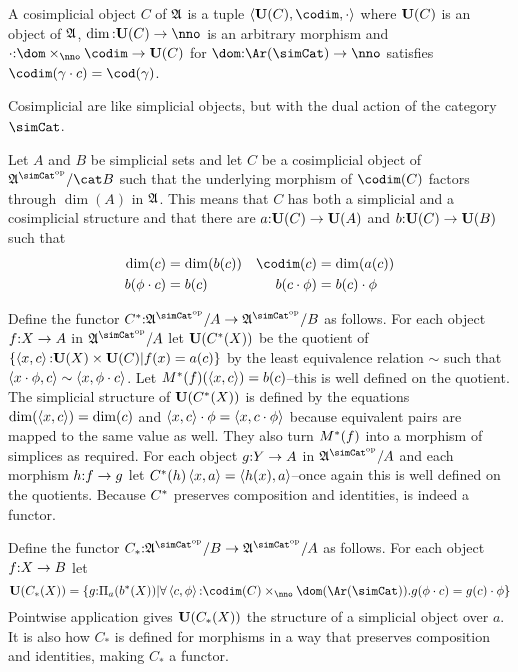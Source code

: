 \documentclass[csh.tex]{subfiles}
\begin{document}
\begin{definition} A cosimplicial object $C$ of $\mathfrak A$ is a tuple $\tuplet{\base(C),\codim,\cdot}$ where $\mathbf{U}(C)$ is an object of $\mathfrak A$, $\dim\of\base(C)\to\nno$ is an arbitrary morphism and $\cdot\of \dom\times_{\nno}\codim \to \base (C)$ for $\dom\of \Ar(\simCat)\to\nno$
 satisfies $\codim(\gamma\cdot c) = \cod(\gamma)$.
\end{definition}

Cosimplicial are like simplicial objects, but with the dual action of the category $\simCat$.

\begin{definition} Let $A$ and $B$ be simplicial sets and let $C$ be a cosimplicial object of $\ambient\s/\cat B$ such that the underlying morphism of $\codim(C)$ factors through $\dim(A)$ in $\mathfrak A$. This means that $C$ has both a simplicial and a cosimplicial structure and that
there are $a\mathord :\mathbf{U}(C)\to\mathbf{U}(A)$ and $b\mathord :\mathbf{U}(C)\to\mathbf{U}(B)$ such that 
\begin{align*}
\dim(c) &= \dim(b(c)) & \codim(c) &= \dim(a(c))\\b(\phi\cdot c) &= b(c) & b(c\cdot\phi)&=b(c)\cdot\phi\\
\end{align*}

Define the functor $C\ri\of\ambient\s/A\to \ambient\s/B$ as follows. For each object $f\mathord : X\to A$ in $\ambient \s/A$ let $\mathbf{U}(C^*(X))$ be the quotient of $\left\{\left\langle x,c \right\rangle\mathord : \mathbf{U}(X)\times \mathbf{U}(C)| f(x)=a(c) \right\}$ by the least equivalence relation $\sim$ such that $\left\langle x\cdot\phi,c \right\rangle\sim\left\langle x,\phi\cdot c \right\rangle$. Let $M^*(f)(\left\langle x,c \right\rangle) = b(c)$--this is well defined on the quotient. 
The simplicial structure of $\mathbf{U}(C^*(X))$ is defined by the equations $\dim(\left\langle x,c \right\rangle) = \dim(c)$ and $\left\langle x,c \right\rangle\cdot \phi = \left\langle x,c\cdot\phi \right\rangle$ because equivalent pairs are mapped to the same value as well. They also turn $M^*(f)$ into a morphism of simplices as required. For each object $g\mathord : Y\to A$ in $\ambient \s/A$ and each morphism $h\mathord : f\to g$ let $C^*(h)\left\langle x,a \right\rangle = \left\langle h(x),a \right\rangle$--once again this is well defined on the quotients. Because $C^*$ preserves composition and identities, is indeed a functor.

Define the functor $C_*\of\ambient\s/B\to \ambient\s/A$ as follows. For each object $f\mathord : X\to B$ let 
\[ \base(C_*(X)) = \set{g\of \dprod a(b\ri(X)) | \forall \tuplet{c,\phi}\of\codim(C)\times_\nno\dom(\Ar(\simCat)).g(\phi\cdot c)= g(c)\cdot \phi }\]
Pointwise application gives $\mathbf{U}(C_*(X))$ the structure of a simplicial object over $a$. It is also how $C_*$ is defined for morphisms in a way that preserves composition and identities, making $C_*$ a functor.


\end{definition}
\end{document}
